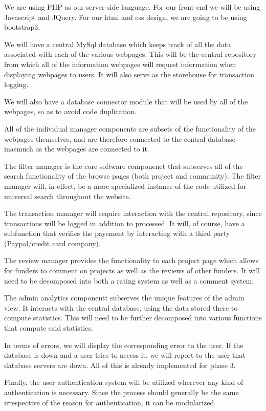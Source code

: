 \documentclass[12pt]{article}
\begin{document}
\begin{enumerate}
We are using PHP as our server-side language. For our front-end we will be using Javascript and JQuery. For our html and css design, we are going to be using bootstrap3.

We will have a central MySql database which keeps track of all the data associated with each of the various webpages. This will be the central repository from which all of the information webpages will request information when displaying webpages to users. It will also serve as the storehouse for transaction logging.

We will also have a database connector module that will be used by all of the webpages, so as to avoid code duplication.

All of the individual manager components are subsets of the functionality of the webpages themselves, and are therefore connected to the central database inasmuch as the webpages are connected to it.

The filter manager is the core software componenet that subserves all of the search functionality of the browse pages (both project and community). The filter manager will, in effect, be a more specialized instance of the code utilized for universal search throughout the website.

The transaction manager will require interaction with the central repository, since transactions will be logged in addition to processed. It will, of course, have a subfunction that verifies the payement by interacting with a third party (Paypal/credit card company).

The review manager provides the functionality to each project page which allows for funders to comment on projects as well as the reviews of other funders. It will need to be decomposed into both a rating system as well as a comment system.

The admin analytics componentt subserves the unique features of the admin view. It interacts with the central database, using the data stored there to compute statistics. This will need to be further decomposed into various functions that compute said statistics.

In terms of errors, we will display the corresponding error to the user. If the database is down and a user tries to access it, we will report to the user that database servers are down. All of this is already implemented for phase 3.


Finally, the user authentication system will be utilized wherever any kind of authentication is necessary. Since the process should generally be the same irrespective of the reason for authentication, it can be modularized.



\end{enumerate}
\end{document}
